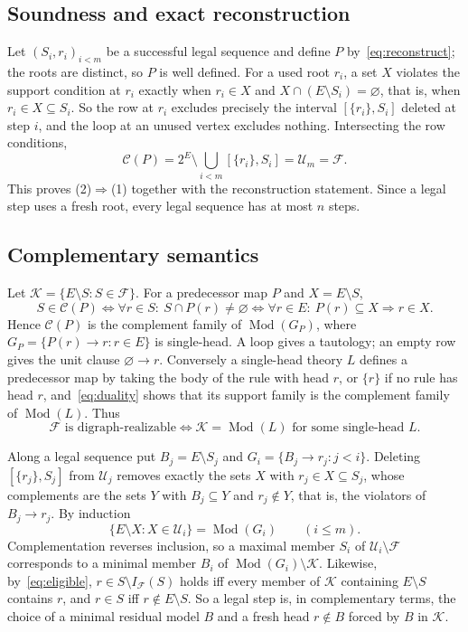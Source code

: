 \documentclass[11pt,a4paper]{article}
\theoremstyle{plain}
\theoremstyle{definition}
\theoremstyle{remark}
\newcommand{\cC}{\mathcal C}
\newcommand{\cF}{\mathcal F}
\newcommand{\cK}{\mathcal K}
\newcommand{\cU}{\mathcal U}
\newcommand{\Mod}{\operatorname{Mod}}
\newcommand{\Int}{I_{\cF}}
\newcommand{\ivl}[2]{[\{#1\},#2]}
\newcommand{\pw}[1]{2^{#1}}
\begin{document}
\subsection{Soundness and exact reconstruction}

Let $(S_i,r_i)_{i<m}$ be a successful legal sequence and define $P$ by~\eqref{eq:reconstruct}; the roots are distinct, so $P$ is well defined. For a used root $r_i$, a set $X$ violates the support condition at $r_i$ exactly when $r_i\in X$ and $X\cap(E\setminus S_i)=\varnothing$, that is, when $r_i\in X\subseteq S_i$. So the row at $r_i$ excludes precisely the interval $\ivl{r_i}{S_i}$ deleted at step $i$, and the loop at an unused vertex excludes nothing. Intersecting the row conditions,
\[
 \cC(P)=\pw{E}\setminus\bigcup_{i<m}\ivl{r_i}{S_i}=\cU_m=\cF .
\]
This proves (2)$\Rightarrow$(1) together with the reconstruction statement. Since a legal step uses a fresh root, every legal sequence has at most $n$ steps.

\subsection{Complementary semantics}\label{sec:complement}

Let $\cK=\{E\setminus S:S\in\cF\}$. For a predecessor map $P$ and $X=E\setminus S$,
\begin{equation}\label{eq:duality}
 S\in\cC(P)
 \iff \forall r\in S:\ S\cap P(r)\neq\varnothing
 \iff \forall r\in E:\ P(r)\subseteq X\Rightarrow r\in X .
\end{equation}
Hence $\cC(P)$ is the complement family of $\Mod(G_P)$, where $G_P=\{P(r)\to r: r\in E\}$ is single-head. A loop gives a tautology; an empty row gives the unit clause $\varnothing\to r$. Conversely a single-head theory $L$ defines a predecessor map by taking the body of the rule with head $r$, or $\{r\}$ if no rule has head $r$, and~\eqref{eq:duality} shows that its support family is the complement family of $\Mod(L)$. Thus
\begin{equation}\label{eq:horn-iff}
 \cF\text{ is digraph-realizable}\iff\cK=\Mod(L)\text{ for some single-head }L .
\end{equation}

Along a legal sequence put $B_j=E\setminus S_j$ and $G_i=\{B_j\to r_j: j<i\}$. Deleting $\ivl{r_j}{S_j}$ from $\cU_j$ removes exactly the sets $X$ with $r_j\in X\subseteq S_j$, whose complements are the sets $Y$ with $B_j\subseteq Y$ and $r_j\notin Y$, that is, the violators of $B_j\to r_j$. By induction
\begin{equation}\label{eq:current}
 \{E\setminus X: X\in\cU_i\}=\Mod(G_i)\qquad(i\le m).
\end{equation}
Complementation reverses inclusion, so a maximal member $S_i$ of $\cU_i\setminus\cF$ corresponds to a minimal member $B_i$ of $\Mod(G_i)\setminus\cK$. Likewise, by~\eqref{eq:eligible}, $r\in S\setminus\Int(S)$ holds iff every member of $\cK$ containing $E\setminus S$ contains $r$, and $r\in S$ iff $r\notin E\setminus S$. So a legal step is, in complementary terms, the choice of a minimal residual model $B$ and a fresh head $r\notin B$ forced by $B$ in $\cK$.
\end{document}
